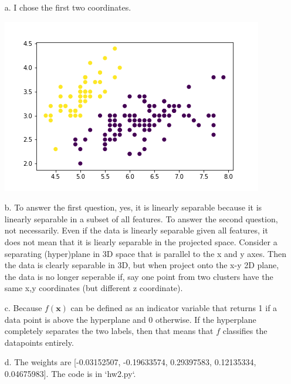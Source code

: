 \documentclass[11pt]{article}
\newcommand{\bx}{\mathbf{x}}
\begin{document}
\color{blue}
\begin{itemize}
\item[a.] I chose the first two coordinates.

\includegraphics[scale=0.8]{iris}
\item[b.] To answer the first question, yes, it is linearly separable because it is linearly separable in a subset of all features. To answer the second question, not necessarily. Even if the data is linearly separable given all features, it does not mean that it is liearly separable in the projected space. Consider a separating (hyper)plane in 3D space that is parallel to the x and y axes. Then the data is clearly separable in 3D, but when project onto the x-y 2D plane, the data is no longer seperable if, say one point from two clusters have the same x,y coordinates (but different z coordinate).
\item[c.] Because $f(\bx)$ can be defined as an indicator variable that returns 1 if a data point is above the hyperplane and 0 otherwise. If the hyperplane completely separates the two labels, then that means that $f$ classifies the datapoints entirely.
\item[d.] The weights are [-0.03152507, -0.19633574,  0.29397583,  0.12135334,  0.04675983]. The code is in `hw2.py`.
\end{itemize}
\color{black}
\end{document}
